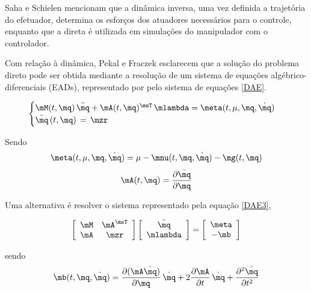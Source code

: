 \documentclass[]{politex}
\begin{document}
Saha e Schielen \cite{Saha} mencionam que a dinâmica inversa, uma vez definida a trajetória do efetuador, determina os esforços dos atuadores necessários para o controle, enquanto que a direta é utilizada em simulações do manipulador com o controlador.

Com relação à dinâmica, Pekal e Fraczek \cite{Pekal2} esclarecem que a solução do problema direto pode ser obtida mediante a resolução de um sistema de equações algébrico-diferenciais (EADs), representado por pelo sistema de equações \eqref{DAE}.

\begin{equation} \label{DAE}
\begin{cases}
\mM(t,\mq) \, \ddot{\mq} + \mA(t,\mq)^\msT \,\mlambda = \meta(t,\mu,\mq, \dot{\mq}) \\
\bar{\mq} \, (t,\mq) \, = \, \mzr
\end{cases}
\end{equation}

Sendo
\begin{equation}
\meta(t,\mu,\mq, \dot{\mq}) = \mu - \mnu(t,\mq,\dot{\mq}) - \mg(t,\mq)
\end{equation}
\begin{equation}
\mA(t,\mq) = \frac{\partial \bar{\mq}}{\partial \mq}
\end{equation}

Uma alternativa é resolver o sistema representado pela equação \eqref{DAE3}, 

\begin{equation}
\left[ \begin{array}{cc}
\mM & \mA^\msT \\
\mA & \mzr
\end{array}
\right]
\left[ \begin{array}{c}
\ddot{\mq} \\
\mlambda
\end{array}
\right] =
\left[ \begin{array}{c}
\meta \\
-\mb
\end{array}
\right]
\label{DAE3}
\end{equation}

\vspace{0.5cm}

sendo
\begin{equation}
\mb(t,\mq,\dot{\mq}) = \frac{\partial (\mA \dot{\mq})}{\partial \mq} \, \dot{\mq} + 2 \frac{\partial \mA}{\partial t} \, \dot{\mq} + \frac{\partial^2 \bar{\mq}}{\partial t^2}
\end{equation}
\end{document}
